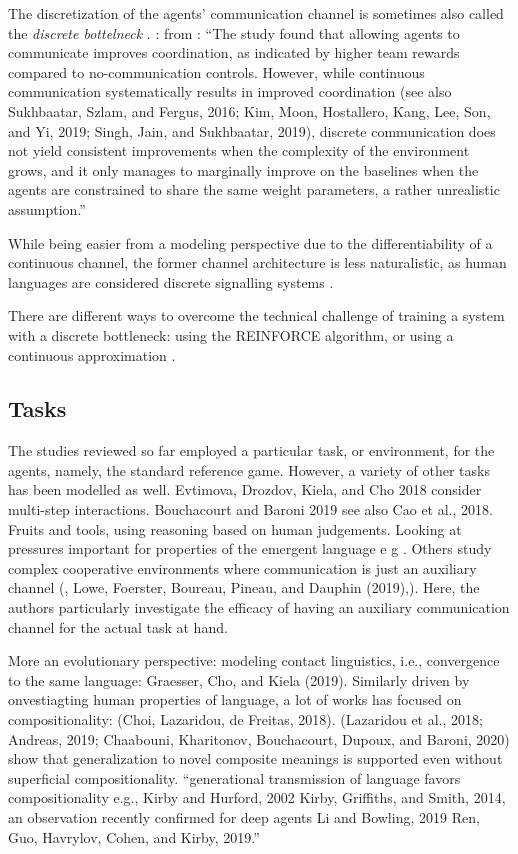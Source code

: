 The discretization of the agents' communication channel is sometimes also called the \textit{discrete bottelneck} \parencite{lazaridou2020multi}. \parencite{foerster2016learning}: from \cite{lazaridou2020multi}: ``The study found that allowing agents to communicate improves coordination, as indicated by higher team rewards compared to no-communication controls. However, while continuous communication systematically results in improved coordination (see also Sukhbaatar, Szlam, and Fergus, 2016; Kim, Moon, Hostallero, Kang, Lee, Son, and Yi, 2019; Singh, Jain, and Sukhbaatar, 2019), discrete communication does not yield consistent improvements when the complexity of the environment grows, and it only manages to marginally improve on the baselines when the agents are constrained to share the same weight parameters, a rather unrealistic assumption.''

While being easier from a modeling perspective due to the differentiability of a continuous channel, the former channel architecture is less naturalistic, as human languages are considered discrete signalling systems \parencite{hockett1960origin}. 

There are different ways to overcome the technical challenge of training a system with a discrete bottleneck: using the REINFORCE algorithm, or using a continuous approximation \cite{havrylov2017emergence}. 

\subsection{Tasks}

The studies reviewed so far employed a particular  task, or environment, for the agents, namely, the standard reference game. However, a variety of other tasks has been modelled as well.
Evtimova, Drozdov, Kiela, and Cho 2018 consider multi-step interactions. Bouchacourt and Baroni 2019 see also Cao et al., 2018. Fruits and tools, using reasoning based on human judgements.
Looking at pressures important for properties of the emergent language e g  \parencite{bouchacourt2018agents}. 
Others study complex cooperative environments where communication is just an auxiliary channel (\parencite{das2019tarmac}, Lowe, Foerster, Boureau, Pineau, and Dauphin (2019),). Here, the authors particularly investigate the efficacy of having an auxiliary communication channel for the actual task at hand.

More an evolutionary perspective: modeling contact linguistics, i.e., convergence to the same language: Graesser, Cho, and Kiela (2019). Similarly driven by onvestiagting human properties of language, a lot of works has focused on compositionality: (Choi, Lazaridou, de Freitas, 2018). (Lazaridou et al., 2018; Andreas, 2019; Chaabouni, Kharitonov, Bouchacourt, Dupoux, and Baroni, 2020) show that generalization to novel composite meanings is supported even without superficial compositionality. 
``generational transmission of language favors compositionality e.g., Kirby and Hurford, 2002 Kirby, Griffiths, and Smith, 2014, an observation recently confirmed for deep agents Li and Bowling, 2019 Ren, Guo, Havrylov, Cohen, and Kirby, 2019.''

